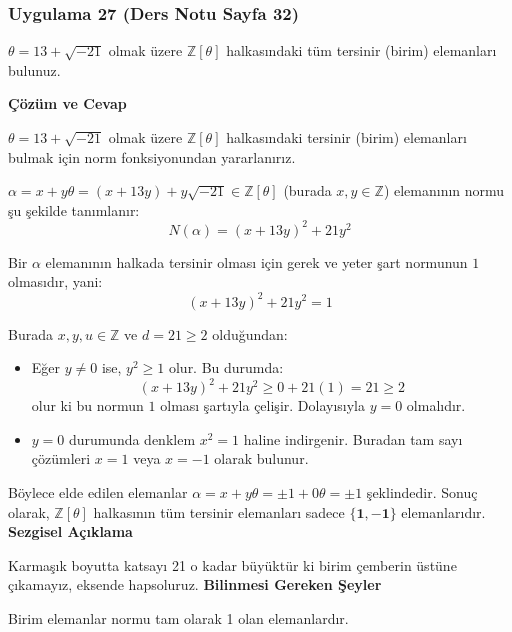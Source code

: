 \documentclass[11pt, a4paper]{article}
\newenvironment{cozum}{
    \vspace{0.5cm}
    \noindent\textcolor{green!60!black}{\faCheckCircle\enspace \textbf{\Large Çözüm ve Cevap}}\par\vspace{0.2cm}
}{}
\newenvironment{sezgisel}{
    \vspace{0.5cm}
    \noindent\textcolor{orange!80!black}{\faLightbulb\enspace \textbf{\Large Sezgisel Açıklama}}\par\vspace{0.2cm}
    \itshape
}{}
\newenvironment{bilgi}{
    \vspace{0.5cm}
    \noindent\textcolor{red!70!black}{\faExclamationTriangle\enspace \textbf{\Large Bilinmesi Gereken Şeyler}}\par\vspace{0.2cm}
}{}
\begin{document}
\subsubsection{Uygulama 27 (Ders Notu Sayfa 32)}
\begin{sorubox}
$\theta = 13 + \sqrt{-21}$ olmak üzere $\mathbb{Z}[\theta]$ halkasındaki tüm tersinir (birim) elemanları bulunuz.
\end{sorubox}
\begin{cozum}
$\theta = 13 + \sqrt{-21}$ olmak üzere $\mathbb{Z}[\theta]$ halkasındaki tersinir (birim) elemanları bulmak için norm fonksiyonundan yararlanırız.

$\alpha = x + y\theta = (x + 13y) + y\sqrt{-21} \in \mathbb{Z}[\theta]$ (burada $x, y \in \mathbb{Z}$) elemanının normu şu şekilde tanımlanır:
\[ N(\alpha) = (x + 13y)^2 + 21 y^2 \]

Bir $\alpha$ elemanının halkada tersinir olması için gerek ve yeter şart normunun $1$ olmasıdır, yani:
\[ (x + 13y)^2 + 21 y^2 = 1 \]

Burada $x, y, u \in \mathbb{Z}$ ve $d = 21 \ge 2$ olduğundan:
\begin{itemize}
    \item Eğer $y \neq 0$ ise, $y^2 \ge 1$ olur. Bu durumda:
    \[ (x + 13y)^2 + 21 y^2 \ge 0 + 21(1) = 21 \ge 2 \]
    olur ki bu normun $1$ olması şartıyla çelişir. Dolayısıyla $y = 0$ olmalıdır.
    \item $y = 0$ durumunda denklem $x^2 = 1$ haline indirgenir. Buradan tam sayı çözümleri $x = 1$ veya $x = -1$ olarak bulunur.
\end{itemize}

Böylece elde edilen elemanlar $\alpha = x + y\theta = \pm 1 + 0\theta = \pm 1$ şeklindedir. Sonuç olarak, $\mathbb{Z}[\theta]$ halkasının tüm tersinir elemanları sadece $\mathbf{\{1, -1\}}$ elemanlarıdır.
\end{cozum}
\begin{sezgisel}
Karmaşık boyutta katsayı 21 o kadar büyüktür ki birim çemberin üstüne çıkamayız, eksende hapsoluruz.
\end{sezgisel}
\begin{bilgi}
Birim elemanlar normu tam olarak 1 olan elemanlardır.
\end{bilgi}

\newpage
\end{document}
